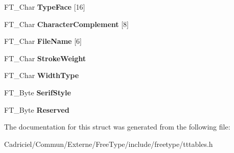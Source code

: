\begin{DoxyCompactItemize}
\item 
\hypertarget{struct_t_t___p_c_l_t___a47c2c6b276f3ab2002fe03af41dad396}{F\-T\-\_\-\-Char {\bfseries Type\-Face} \mbox{[}16\mbox{]}}\label{struct_t_t___p_c_l_t___a47c2c6b276f3ab2002fe03af41dad396}

\item 
\hypertarget{struct_t_t___p_c_l_t___a2641686beb550bcf8d9e598336f0acd9}{F\-T\-\_\-\-Char {\bfseries Character\-Complement} \mbox{[}8\mbox{]}}\label{struct_t_t___p_c_l_t___a2641686beb550bcf8d9e598336f0acd9}

\item 
\hypertarget{struct_t_t___p_c_l_t___a87691bde7cb06e3043f5320c8223e768}{F\-T\-\_\-\-Char {\bfseries File\-Name} \mbox{[}6\mbox{]}}\label{struct_t_t___p_c_l_t___a87691bde7cb06e3043f5320c8223e768}

\item 
\hypertarget{struct_t_t___p_c_l_t___aaf28b05ac07bcdc1ae6f4ec9064434fc}{F\-T\-\_\-\-Char {\bfseries Stroke\-Weight}}\label{struct_t_t___p_c_l_t___aaf28b05ac07bcdc1ae6f4ec9064434fc}

\item 
\hypertarget{struct_t_t___p_c_l_t___ad6613ad7556599343f999a7d27a0f1d0}{F\-T\-\_\-\-Char {\bfseries Width\-Type}}\label{struct_t_t___p_c_l_t___ad6613ad7556599343f999a7d27a0f1d0}

\item 
\hypertarget{struct_t_t___p_c_l_t___aa8e3d35937660a1e4959ee10a4800e6a}{F\-T\-\_\-\-Byte {\bfseries Serif\-Style}}\label{struct_t_t___p_c_l_t___aa8e3d35937660a1e4959ee10a4800e6a}

\item 
\hypertarget{struct_t_t___p_c_l_t___a2e46e3f5eaa51e02d831d3f6143f8846}{F\-T\-\_\-\-Byte {\bfseries Reserved}}\label{struct_t_t___p_c_l_t___a2e46e3f5eaa51e02d831d3f6143f8846}

\end{DoxyCompactItemize}


The documentation for this struct was generated from the following file\-:\begin{DoxyCompactItemize}
\item 
Cadriciel/\-Commun/\-Externe/\-Free\-Type/include/freetype/tttables.\-h\end{DoxyCompactItemize}
